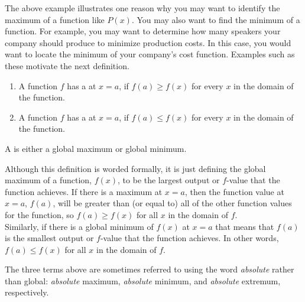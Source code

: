 \documentclass{ximera}
\begin{document}
The above example illustrates one reason why you may want to identify the maximum of a function like $P(x)$.  You may also want to find the minimum of a function.  For example, you may want to determine how many speakers your company should produce to minimize production costs.  In this case, you would want to locate the minimum of your company's cost function.  Examples such as these motivate the next definition. 

\begin{definition}\hfil{}
\begin{enumerate}
\item A function $f$ has a  at $x=a$, if $f(a)\ge
  f(x)$ for every $x$ in the domain of the function.
\item A function $f$ has a  at $x=a$, if $f(a)\le
  f(x)$ for every $x$ in the domain of the function.
\end{enumerate} 
A  is either a
global maximum or global minimum.  
\end{definition}

\begin{explanation}
Although this definition is worded formally, it is just defining the global maximum of a function, $f(x)$, to be the largest output or $f$-value that the function achieves.  If there is a maximum at $x=a$, then the function value at $x=a$, $f(a)$, will be greater than (or equal to) all of the other function values for the function, so $f(a) \geq f(x)$ for all $x$ in the domain of $f$.  \\

Similarly, if there is a global minimum of $f(x)$ at $x=a$ that means that $f(a)$ is the smallest output or $f$-value that the function achieves.  In other words, $f(a) \leq f(x)$ for all $x$ in the domain of $f$. \\
\end{explanation}

\begin{warning}
The three terms above are sometimes referred to using the word \textit{absolute} rather than global: \textit{absolute} maximum, \textit{absolute} minimum, and \textit{absolute} extremum, respectively.
\end{warning}
\end{document}
